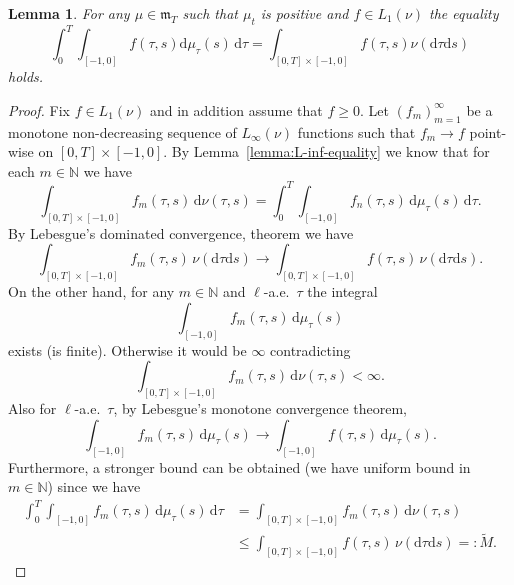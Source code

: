\documentclass[reqno]{amsart}
\theoremstyle{plain}
\newtheorem{lemma}{Lemma}[section]
\numberwithin{equation}{section}
\numberwithin{definition}{section}
\newcommand\NN{\ensuremath{\mathbb{N}}}
\newcommand{\dd}{\ensuremath{\mathrm{d}}}
\begin{document}
\begin{lemma}\label{lemma:L1-equality-positive-measures} For any $\mu\in\mathfrak{m}_T$ such that $\mu_t$ is positive and $f\in L_{1}(\nu)$ the equality 
    \begin{equation*}
  \int_0^T \int_{[-1,0]} f(\tau,s)  \dd \mu_{\tau} (s) \,\dd\tau = \int_{[0,T]\times [-1,0]} f(\tau,s)\nu(\dd \tau  \dd s) 
\end{equation*}
holds.  
\end{lemma}
\begin{proof}
   Fix $f\in L_1(\nu)$ and in addition assume that $f\ge 0$. Let $(f_{m})_{m=1}^{\infty}$ be a monotone non-decreasing sequence of $L_{\infty}(\nu)$ functions such that $f_{m}\to f$ point-wise on $[0,T]\times [-1,0]$. By Lemma~\ref{lemma:L-inf-equality} we know that for each $m\in \NN$ we have 
   \begin{equation*}
       \int_{[0,T]\times [-1,0]} f_{m}(\tau,s) \, \dd \nu(\tau,s)= \int_0^{T}\int_{[-1,0]} f_n(\tau,s)\, \dd \mu_{\tau} (s) \,\dd \tau. 
\end{equation*} 
By Lebesgue's dominated convergence, theorem we have 
\begin{equation*}
     \int_{[0,T]\times [-1,0]} f_{m}(\tau,s) \, \nu(\dd \tau\dd s )\to  \int_{[0,T]\times [-1,0]} f(\tau,s) \, \nu(\dd \tau\dd s ).
\end{equation*}
On the other hand, for any $m\in\NN$ and $\ell$-a.e.\ $\tau$ the integral   
\begin{equation*}
    \int_{[-1,0]} f_{m}(\tau,s)\, \dd \mu_{\tau} (s)  
\end{equation*}
exists (is finite). Otherwise it would be $\infty$ contradicting  
\begin{equation*}
     \int_{[0,T]\times [-1,0]} f_m(\tau,s)  \,\dd \nu(\tau,s)<\infty. 
\end{equation*}
Also for $\ell$-a.e.\ $\tau$, by Lebesgue's monotone convergence theorem,  
\begin{equation*}
    \int_{[-1,0]} f_m(\tau,s)\, \dd \mu_{\tau} (s)  \to  \int_{[-1,0]} f(\tau,s)\, \dd \mu_{\tau} (s). 
\end{equation*}
Furthermore, a stronger bound can be obtained (we have uniform bound in $m\in\NN$) since we have 
\begin{align*}
    \int_0^{T}\int_{[-1,0]} f_m(\tau,s)\, \dd \mu_{\tau} (s) \,\dd \tau & = \int_{[0,T]\times [-1,0]} f_m(\tau,s) \, \dd \nu(\tau,s)\\ &
    \le  \int_{[0,T]\times [-1,0]} f(\tau,s) \, \nu(\dd \tau\dd s )=:\widetilde{M}.

\end{align*}
\end{proof}
\end{document}
